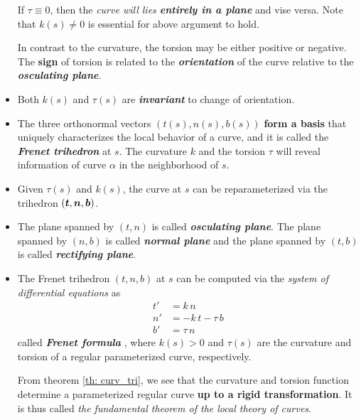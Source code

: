 \documentclass[11pt]{article}
\begin{document}
\begin{itemize}
If $\tau \equiv 0$, then the \emph{curve will lies \textbf{entirely in a plane}} and vise versa.   Note that $k(s)\neq 0$ is essential for above argument to hold. 

In contrast to the curvature, the torsion may be either positive or negative. The \textbf{sign} of torsion is related to the \emph{\textbf{orientation}} of the curve relative to the \emph{\textbf{osculating plane}}. 

\item Both $k(s)$ and $\tau(s)$ are \emph{\textbf{invariant}} to change of orientation. 

\item The three orthonormal vectors $(t(s), n(s), b(s))$ \textbf{form a basis} that uniquely characterizes the local behavior of a curve, and it is called the \emph{\textbf{Frenet trihedron}} at $s$. The curvature $k$ and the torsion $\tau$ will reveal information of curve $\alpha$ in the neighborhood of $s$.

\item Given $\tau(s)$ and $k(s)$, the curve at $s$ can be reparameterized via the trihedron $(\boldsymbol{t}, \boldsymbol{n}, \boldsymbol{b})$. 

\item The plane spanned by $(t, n)$ is called \emph{\textbf{osculating plane}}. The plane spanned by $(n, b)$ is called \emph{\textbf{normal plane}} and the plane spanned by $(t, b)$ is called \emph{\textbf{rectifying plane}}.

\item The Frenet trihedron $(t, n, b)$ at $s$ can be computed via the \emph{system of differential equations} as 
\begin{align}
t' &= k\,n\nonumber\\
n' &= -k\,t - \tau\,b\nonumber\\
b' &= \tau\,n \label{eqn: Frenet_formula}
\end{align}
called \emph{\textbf{Frenet formula}} \citep{do1976differential}, where $k(s)>0$ and $\tau(s)$ are the curvature and torsion of a regular parameterized curve, respectively.  

From theorem \ref{th: curv_tri}, we see that the curvature and torsion function determine a parameterized regular curve \textbf{up to a rigid transformation}.  It is thus called \emph{the fundamental theorem of the local theory of curves}.


\end{itemize}
\end{document}
